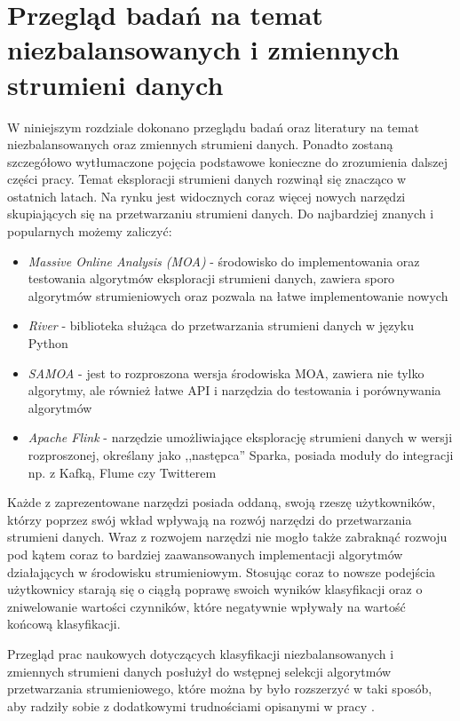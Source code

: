 \chapter{Przegląd badań na temat niezbalansowanych i zmiennych strumieni danych}

\noindent W niniejszym rozdziale dokonano przeglądu badań oraz literatury na temat niezbalansowanych oraz zmiennych strumieni danych. Ponadto zostaną szczegółowo wytłumaczone pojęcia podstawowe konieczne do zrozumienia dalszej części pracy. Temat eksploracji strumieni danych rozwinął się znacząco w ostatnich latach. Na rynku jest widocznych coraz więcej nowych narzędzi skupiających się na przetwarzaniu strumieni danych. Do najbardziej znanych i popularnych możemy zaliczyć:

\begin{itemize}
    \item \textit{Massive Online Analysis (MOA)} - środowisko do implementowania oraz testowania algorytmów eksploracji strumieni danych, zawiera sporo algorytmów strumieniowych oraz pozwala na łatwe implementowanie nowych \cite{Article:MOA}
    \item \textit{River} - biblioteka służąca do przetwarzania strumieni danych w języku Python \cite{Article:River}
    \item \textit{SAMOA} - jest to rozproszona wersja środowiska MOA, zawiera nie tylko algorytmy, ale również łatwe API i narzędzia do testowania i porównywania algorytmów \cite{Article:Samoa}
    \item \textit{Apache Flink} - narzędzie umożliwiające eksplorację strumieni danych w wersji rozproszonej, określany jako ,,następca'' Sparka, posiada moduły do integracji np. z Kafką, Flume czy Twitterem \cite{Article:Flink}
\end{itemize}

\noindent Każde z zaprezentowane narzędzi posiada oddaną, swoją rzeszę użytkowników, którzy poprzez swój wkład wpływają na rozwój narzędzi do przetwarzania strumieni danych. Wraz z rozwojem narzędzi nie mogło także zabraknąć rozwoju pod kątem coraz to bardziej zaawansowanych implementacji algorytmów działających w środowisku strumieniowym. Stosując coraz to nowsze podejścia użytkownicy starają się o ciągłą poprawę swoich wyników klasyfikacji oraz o zniwelowanie wartości czynników, które negatywnie wpływały na wartość końcową klasyfikacji. 

Przegląd prac naukowych dotyczących klasyfikacji niezbalansowanych i zmiennych strumieni danych posłużył do wstępnej selekcji algorytmów przetwarzania strumieniowego, które można by było rozszerzyć w taki sposób, aby radziły sobie z dodatkowymi trudnościami opisanymi w pracy \cite{Article:TypyPrzykladow}.

